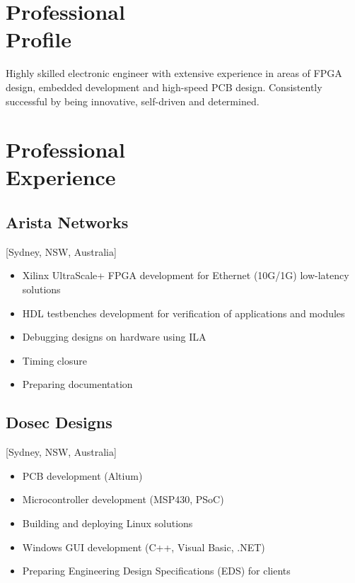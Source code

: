 \documentclass{mycv}
\begin{document}
\maketitle%

\section{Professional \\ Profile}

Highly skilled electronic engineer with extensive experience in areas of FPGA design, embedded development and high-speed PCB design. 
Consistently successful by being innovative, self-driven and determined.

\section{Professional \\ Experience}

\subsection{Arista Networks}[Sydney, NSW, Australia]
\begin{positions}
\end{positions}

\begin{itemize}[noitemsep]
  \item Xilinx UltraScale+ FPGA development for Ethernet (10G/1G) low-latency solutions
  \item HDL testbenches development for verification of applications and modules
  \item Debugging designs on hardware using ILA
  \item Timing closure
  \item Preparing documentation
\end{itemize}

\subsection{Dosec Designs}[Sydney, NSW, Australia]
\begin{positions}
\end{positions}

\begin{itemize}[noitemsep]
  \item PCB development (Altium)
  \item Microcontroller development (MSP430, PSoC)
  \item Building and deploying Linux solutions
  \item Windows GUI development (C++, Visual Basic, .NET)
  \item Preparing Engineering Design Specifications (EDS) for clients
\end{itemize}
\end{document}
